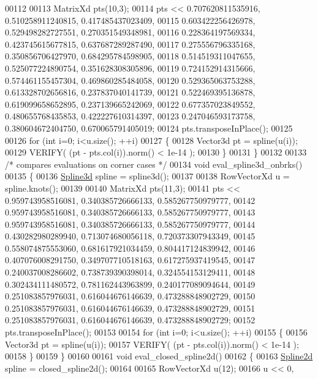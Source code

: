 \begin{DoxyCode}
00112 
00113   MatrixXd pts(10,3);
00114   pts << 0.707620811535916,   0.510258911240815,   0.417485437023409,
00115     0.603422256426978,   0.529498282727551,   0.270351549348981,
00116     0.228364197569334,   0.423745615677815,   0.637687289287490,
00117     0.275556796335168,   0.350856706427970,   0.684295784598905,
00118     0.514519311047655,   0.525077224890754,   0.351628308305896,
00119     0.724152914315666,   0.574461155457304,   0.469860285484058,
00120     0.529365063753288,   0.613328702656816,   0.237837040141739,
00121     0.522469395136878,   0.619099658652895,   0.237139665242069,
00122     0.677357023849552,   0.480655768435853,   0.422227610314397,
00123     0.247046593173758,   0.380604672404750,   0.670065791405019;
00124   pts.transposeInPlace();
00125 
00126   \textcolor{keywordflow}{for} (\textcolor{keywordtype}{int} i=0; i<u.size(); ++i)
00127   \{
00128     Vector3d pt = spline(u(i));
00129     VERIFY( (pt - pts.col(i)).norm() < 1e-14 );
00130   \}
00131 \}
00132 
00133 \textcolor{comment}{/* compares evaluations on corner cases */}
00134 \textcolor{keywordtype}{void} eval\_spline3d\_onbrks()
00135 \{
00136   \hyperlink{namespace_eigen_a652b0c454d2123a13f04922404bed782}{Spline3d} spline = spline3d();
00137 
00138   RowVectorXd u = spline.knots();
00139 
00140   MatrixXd pts(11,3);
00141   pts <<    0.959743958516081,   0.340385726666133,   0.585267750979777,
00142     0.959743958516081,   0.340385726666133,   0.585267750979777,
00143     0.959743958516081,   0.340385726666133,   0.585267750979777,
00144     0.430282980289940,   0.713074680056118,   0.720373307943349,
00145     0.558074875553060,   0.681617921034459,   0.804417124839942,
00146     0.407076008291750,   0.349707710518163,   0.617275937419545,
00147     0.240037008286602,   0.738739390398014,   0.324554153129411,
00148     0.302434111480572,   0.781162443963899,   0.240177089094644,
00149     0.251083857976031,   0.616044676146639,   0.473288848902729,
00150     0.251083857976031,   0.616044676146639,   0.473288848902729,
00151     0.251083857976031,   0.616044676146639,   0.473288848902729;
00152   pts.transposeInPlace();
00153 
00154   \textcolor{keywordflow}{for} (\textcolor{keywordtype}{int} i=0; i<u.size(); ++i)
00155   \{
00156     Vector3d pt = spline(u(i));
00157     VERIFY( (pt - pts.col(i)).norm() < 1e-14 );
00158   \}
00159 \}
00160 
00161 \textcolor{keywordtype}{void} eval\_closed\_spline2d()
00162 \{
00163   \hyperlink{namespace_eigen_aad3d357fe2fef560e7d8e592fb215fbf}{Spline2d} spline = closed\_spline2d();
00164 
00165   RowVectorXd u(12);
00166   u << 0,

\end{DoxyCode}
